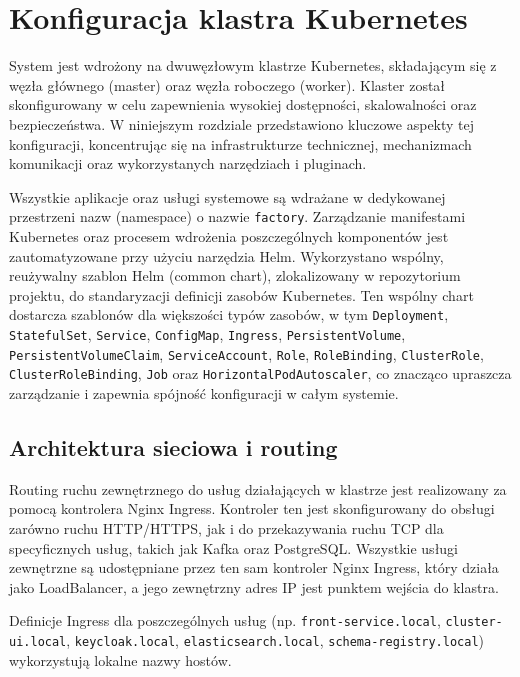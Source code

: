 \section{Konfiguracja klastra Kubernetes}
\label{chap:konfiguracja_kubernetes}

System jest wdrożony na dwuwęzłowym klastrze Kubernetes, składającym się z węzła głównego (master) oraz węzła roboczego (worker). Klaster został skonfigurowany w celu zapewnienia wysokiej dostępności, skalowalności oraz bezpieczeństwa. W niniejszym rozdziale przedstawiono kluczowe aspekty tej konfiguracji, koncentrując się na infrastrukturze technicznej, mechanizmach komunikacji oraz wykorzystanych narzędziach i pluginach.

Wszystkie aplikacje oraz usługi systemowe są wdrażane w dedykowanej przestrzeni nazw (namespace) o nazwie \texttt{factory}. Zarządzanie manifestami Kubernetes oraz procesem wdrożenia poszczególnych komponentów jest zautomatyzowane przy użyciu narzędzia Helm. Wykorzystano wspólny, reużywalny szablon Helm (common chart), zlokalizowany w repozytorium projektu, do standaryzacji definicji zasobów Kubernetes. Ten wspólny chart dostarcza szablonów dla większości typów zasobów, w tym \texttt{Deployment}, \texttt{StatefulSet}, \texttt{Service}, \texttt{ConfigMap}, \texttt{Ingress}, \texttt{PersistentVolume}, \texttt{PersistentVolumeClaim}, \texttt{ServiceAccount}, \texttt{Role}, \texttt{RoleBinding}, \texttt{ClusterRole}, \texttt{ClusterRoleBinding}, \texttt{Job} oraz \texttt{HorizontalPodAutoscaler}, co znacząco upraszcza zarządzanie i zapewnia spójność konfiguracji w całym systemie.

\subsection{Architektura sieciowa i routing}

Routing ruchu zewnętrznego do usług działających w klastrze jest realizowany za pomocą kontrolera Nginx Ingress. Kontroler ten jest skonfigurowany do obsługi zarówno ruchu HTTP/HTTPS, jak i do przekazywania ruchu TCP dla specyficznych usług, takich jak Kafka oraz PostgreSQL. Wszystkie usługi zewnętrzne są udostępniane przez ten sam kontroler Nginx Ingress, który działa jako LoadBalancer, a jego zewnętrzny adres IP jest punktem wejścia do klastra.

Definicje Ingress dla poszczególnych usług (np. \texttt{front-service.local}, \texttt{cluster-ui.local}, \texttt{keycloak.local}, \texttt{elasticsearch.local}, \texttt{schema-registry.local}) wykorzystują lokalne nazwy hostów.

